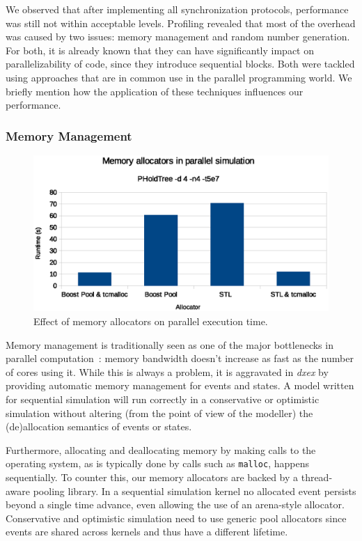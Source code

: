 We observed that after implementing all synchronization protocols, performance was still not within acceptable levels.
Profiling revealed that most of the overhead was caused by two issues: memory management and random number generation.
For both, it is already known that they can have significantly impact on parallelizability of code, since they introduce sequential blocks.
Both were tackled using approaches that are in common use in the parallel programming world.
We briefly mention how the application of these techniques influences our performance.

\subsubsection{Memory Management}
\label{sec:4-subsec:overhead-pgraph:memory}
\begin{figure}
    \center
    \includegraphics[width=\columnwidth]{fig/memory_allocators_parallel.eps}
    \caption{Effect of memory allocators on parallel execution time.}
    \label{fig:memallocators_parallel}
\end{figure}
Memory management is traditionally seen as one of the major bottlenecks in parallel computation~\cite{Memory}: memory bandwidth doesn't increase as fast as the number of cores using it.
While this is always a problem, it is aggravated in \textit{dxex} by providing automatic memory management for events and states.
A model written for sequential simulation will run correctly in a conservative or optimistic simulation without altering (from the point of view of the modeller) the (de)allocation semantics of events or states.

Furthermore, allocating and deallocating memory by making calls to the operating system, as is typically done by calls such as \texttt{malloc}, happens sequentially.
To counter this, our memory allocators are backed by a thread-aware pooling library.
In a sequential simulation kernel no allocated event persists beyond a single time advance, even allowing the use of an arena-style allocator.
Conservative and optimistic simulation need to use generic pool allocators since events are shared across kernels and thus have a different lifetime.

